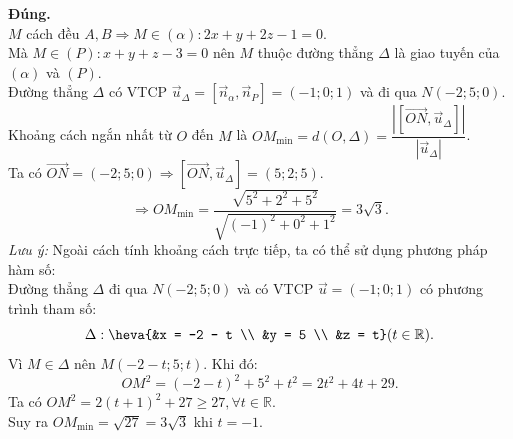 \begin{ex}
{\begin{itemchoice}
			\itemch \textbf{Đúng.} \\
			$M$ cách đều $A, B \Rightarrow M \in (\alpha) \colon 2x + y + 2z - 1 = 0$. \\
			Mà $M \in (P) \colon x + y + z - 3 = 0$ nên $M$ thuộc đường thẳng $\Delta$ là giao tuyến của $(\alpha)$ và $(P)$. \\
			Đường thẳng $\Delta$ có VTCP $\vec{u}_{\Delta} = [\vec{n}_{\alpha}, \vec{n}_P] = (-1; 0; 1)$ và đi qua $N(-2; 5; 0)$. \\
			Khoảng cách ngắn nhất từ $O$ đến $M$ là $OM_{\min} = d(O, \Delta) = \dfrac{|[\overrightarrow{ON}, \vec{u}_{\Delta}]|}{|\vec{u}_{\Delta}|}$. \\
			Ta có $\overrightarrow{ON} = (-2; 5; 0) \Rightarrow [\overrightarrow{ON}, \vec{u}_{\Delta}] = (5; 2; 5)$. \\
			$$\Rightarrow OM_{\min} = \dfrac{\sqrt{5^2 + 2^2 + 5^2}}{\sqrt{(-1)^2 + 0^2 + 1^2}}  = 3\sqrt{3}.$$
			\textit{Lưu ý:} Ngoài cách tính khoảng cách trực tiếp, ta có thể sử dụng phương pháp hàm số: \\
			Đường thẳng $\Delta$ đi qua $N(-2; 5; 0)$ và có VTCP $\vec{u} = (-1; 0; 1)$ có phương trình tham số:
			$$\Delta: \heva{&x = -2 - t \\ &y = 5 \\ &z = t} (t \in \mathbb{R}).$$
			Vì $M \in \Delta$ nên  $M(-2-t; 5; t)$. Khi đó:
			$$OM^2 = (-2-t)^2 + 5^2 + t^2 = 2t^2 + 4t + 29.$$
			Ta có $OM^2 = 2(t + 1)^2 + 27 \ge 27, \forall t \in \mathbb{R}$. \\
			Suy ra $OM_{\min} = \sqrt{27} = 3\sqrt{3}$ khi $t = -1$.
		\end{itemchoice}
		
	}
\end{ex}

